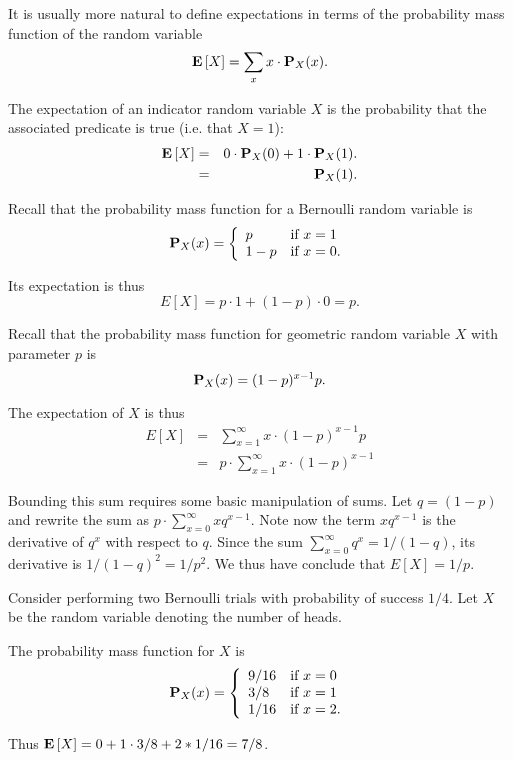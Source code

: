 \begin{flex}
\begin{gram}
It is usually more natural to define expectations in terms of the
probability mass function of the random variable
\[
\mathbf{E}\left[{X}\right] = \sum_{x} x \cdot \mathbf{P}_{X}(x).
\] 
\end{gram}
\begin{example}
The expectation of an indicator random variable $X$ is
the probability that the associated predicate is true (i.e. that
$X= 1$):
\begin{eqnarray*}
\mathbf{E}\left[{X}\right] 
& = & 0 \cdot \mathbf{P}_{X}(0) + 1 \cdot \mathbf{P}_{X}(1).
\\
& = & \mathbf{P}_{X}(1).
\end{eqnarray*}
\end{example}

\begin{example}
Recall that the probability mass function for a Bernoulli random
variable is  
\[
\mathbf{P}_{X}(x) = 
\left\{
\begin{array}{ll}
p & \mbox{if}~x = 1
\\
1-p & \mbox{if}~x = 0.
\end{array}
\right.
\]

Its expectation is thus
\[
E[X] = p \cdot 1 + (1-p) \cdot 0 = p.
\]

\end{example}

\begin{example}
Recall that the probability mass function for geometric random
variable $X$ with parameter $p$ is 
%
\[
\mathbf{P}_{X}(x) = (1-p)^{x-1} p.
\]

The expectation of $X$ is thus
\[
\begin{array}{lll}
E[X] & = & \displaystyle\sum_{x = 1}^{\infty}{x \cdot (1-p)^{x-1} p}
\\
& = &  p\cdot \displaystyle\sum_{x = 1}^{\infty}{x \cdot (1-p)^{x-1}}
\end{array}
\]

Bounding this sum requires some basic manipulation of sums.
%
Let $q = (1-p)$ and rewrite the sum as $p \cdot \sum_{x = 0}^{\infty}{xq^{x-1}}$.
%
Note now the term $xq^{x-1}$ is the derivative of $q^{x}$ with respect
to $q$.
%
Since the sum $\sum_{x=0}^{\infty}{q^x} = 1/(1-q)$, its derivative is
$1/(1-q)^2 = 1/p^2$.
%
We thus have conclude that $E[X] = 1/p$.
\end{example}

\begin{example}
Consider performing two Bernoulli trials with probability of success $1/4$.
Let $X$ be the random variable denoting the number of heads.

The probability mass function for $X$ is
\[
\mathbf{P}_{X}(x) = 
\left\{
\begin{array}{ll}
9/16 & \mbox{if}~x = 0
\\
3/8 & \mbox{if}~x = 1
\\
1/16 & \mbox{if}~x = 2.
\end{array}
\right.
\]

Thus $\mathbf{E}\left[{X}\right] = 0 + 1 \cdot 3/8 + 2 * 1/16 = 7/8$.
\end{example}

\end{flex}


